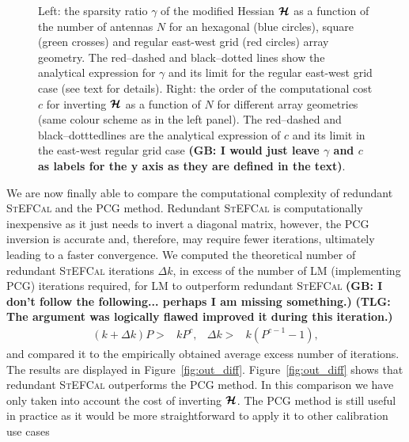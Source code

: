 \documentclass[useAMS,usenatbib]{mn2e}
\newcommand{\bmH}{\bmath{\mathcal{H}}}
\begin{document}
\begin{figure}
\centering
{}
\caption{Left: the sparsity ratio $\gamma$ of the modified Hessian $\bmH$ as a function of the number of antennas $N$ for an hexagonal (blue circles), square (green crosses) and regular east-west grid (red circles) array geometry. The red--dashed and black--dotted lines show the analytical expression for $\gamma$ and its limit for the regular east-west grid case (see text for details). Right: the order of the computational cost $c$ for inverting $\bmH$ as a function of $N$ for different array geometries (same colour scheme as in the left panel). The red--dashed and black--dotttedlines are the analytical expression of $c$ and its limit in the east-west regular grid case {\bf (GB: I would just leave $\gamma$ and $c$ as labels for the y axis as they are defined in the text)}.
\label{fig:sparsity}} 
\end{figure}

We are now finally able to compare the computational complexity of redundant \textsc{StEFCal} and the PCG method. Redundant \textsc{StEFCal} is computationally inexpensive as it just needs to invert a diagonal matrix, however, the PCG inversion is accurate and, therefore, may require fewer iterations, ultimately leading to a faster convergence. 
We computed the theoretical number of redundant \textsc{StEFCal} iterations $\Delta k$, in excess
of the number of LM (implementing PCG) iterations required, for 
LM to outperform redundant \textsc{StEFCal}
{\bf (GB: I don't follow the following... perhaps I am missing something.)}
{\bf (TLG: The argument was logically flawed improved it during this iteration.)}
\begin{align}
\label{eq:k} 
 (k+\Delta k)P >& kP^c, & \Delta k >& k(P^{c-1}-1),
\end{align}
and compared it to the empirically obtained average excess number of iterations. The results are displayed in Figure~\ref{fig:out_diff}. Figure~\ref{fig:out_diff} shows that redundant \textsc{StEFCal} outperforms the PCG method. In this comparison we have only taken into account the cost of inverting $\bmH$. The PCG method is still 
useful in practice as it would be more straightforward to apply it to other calibration use cases 
\end{document}
